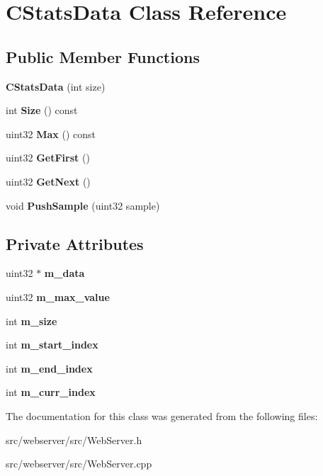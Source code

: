 \section{CStatsData Class Reference}
\label{classCStatsData}
\subsection*{Public Member Functions}
\begin{DoxyCompactItemize}
\item 
{\bfseries CStatsData} (int size)\label{classCStatsData_ab8ff9b6fe0ad9e0cc7ff8fe5ae37b797}

\item 
int {\bfseries Size} () const \label{classCStatsData_abffc9edba0219e2ec12377e58d087568}

\item 
uint32 {\bfseries Max} () const \label{classCStatsData_a7aa34b164bdfbe4f0a69712452ce885b}

\item 
uint32 {\bfseries GetFirst} ()\label{classCStatsData_a5e421ea63e69f972c246141c0d17a5d7}

\item 
uint32 {\bfseries GetNext} ()\label{classCStatsData_a5cea32b24f6772b86f3fd114aa4898ec}

\item 
void {\bfseries PushSample} (uint32 sample)\label{classCStatsData_a40b606f5d471743bdac33fb169446db5}

\end{DoxyCompactItemize}
\subsection*{Private Attributes}
\begin{DoxyCompactItemize}
\item 
uint32 $\ast$ {\bfseries m\_\-data}\label{classCStatsData_aafb16f1f7d8e257a63a4a681d1df8381}

\item 
uint32 {\bfseries m\_\-max\_\-value}\label{classCStatsData_a1c6310d894971227569bc6e982c87222}

\item 
int {\bfseries m\_\-size}\label{classCStatsData_abe0750dd1cc563ef83ed23d349ef1942}

\item 
int {\bfseries m\_\-start\_\-index}\label{classCStatsData_a151efbca1f86f722a042fe71563a8720}

\item 
int {\bfseries m\_\-end\_\-index}\label{classCStatsData_a0027735df43d37b1bc7242d990aff5bc}

\item 
int {\bfseries m\_\-curr\_\-index}\label{classCStatsData_ad2b277eafed0b22da3279306bc43bbb2}

\end{DoxyCompactItemize}


The documentation for this class was generated from the following files:\begin{DoxyCompactItemize}
\item 
src/webserver/src/WebServer.h\item 
src/webserver/src/WebServer.cpp\end{DoxyCompactItemize}
